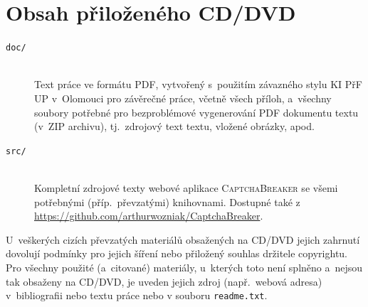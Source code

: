 \documentclass[
  field=ainfp,
  master=true,
  biblatex,
  sourcecodes=false,
  theorems=false,
  glossaries,
  index
]{kidiplom}
\begin{document}
\appendix

\section{Obsah přiloženého CD/DVD} \label{sec:ObsahCD}

\begin{description}

\item[\texttt{doc/}] \hfill \\
  Text práce ve formátu PDF, vytvořený s~použitím závazného stylu KI
  PřF UP v~Olomouci pro závěrečné práce, včetně všech příloh,
  a~všechny soubory potřebné pro bezproblémové vygenerování PDF
  dokumentu textu (v~ZIP archivu), tj.~zdrojový text textu, vložené
  obrázky, apod.

\item[\texttt{src/}] \hfill \\
  Kompletní zdrojové texty webové aplikace \textsc{CaptchaBreaker} se všemi potřebnými (příp.~převzatými) knihovnami. Dostupné také z \url{https://github.com/arthurwozniak/CaptchaBreaker}.

\end{description}

U~veškerých cizích převzatých materiálů obsažených na CD/DVD jejich
zahrnutí dovolují podmínky pro jejich šíření nebo přiložený souhlas
držitele copyrightu. Pro všechny použité (a~citované) materiály,
u~kterých toto není splněno a~nejsou tak obsaženy na CD/DVD, je uveden
jejich zdroj (např.~webová adresa) v~bibliografii nebo textu práce
nebo v souboru \texttt{readme.txt}.


\printglossary


\nocite{*}
\printbibliography
\end{document}
